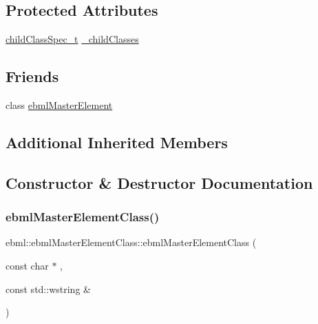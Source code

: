 \subsection*{Protected Attributes}
\begin{DoxyCompactItemize}
\item 
\mbox{\hyperlink{classebml_1_1childClassSpec__t}{child\+Class\+Spec\+\_\+t}} \mbox{\hyperlink{classebml_1_1ebmlMasterElementClass_a2281bbfd89c6c3201c1b778efd428cb7}{\+\_\+child\+Classes}}
\end{DoxyCompactItemize}
\subsection*{Friends}
\begin{DoxyCompactItemize}
\item 
class \mbox{\hyperlink{classebml_1_1ebmlMasterElementClass_ad88e86cba72e9332a4693c1c6009b281}{ebml\+Master\+Element}}
\end{DoxyCompactItemize}
\subsection*{Additional Inherited Members}


\subsection{Constructor \& Destructor Documentation}
\mbox{\label{classebml_1_1ebmlMasterElementClass_a46fb45335e35139c7f694ce9bc247d35}} 
\subsubsection{\texorpdfstring{ebml\+Master\+Element\+Class()}{ebmlMasterElementClass()}\hspace{0.1cm}{\footnotesize\ttfamily [1/2]}}
{\footnotesize\ttfamily ebml\+::ebml\+Master\+Element\+Class\+::ebml\+Master\+Element\+Class (\begin{DoxyParamCaption}\item[{const char $\ast$}]{,  }\item[{const std\+::wstring \&}]{ }\end{DoxyParamCaption})}

